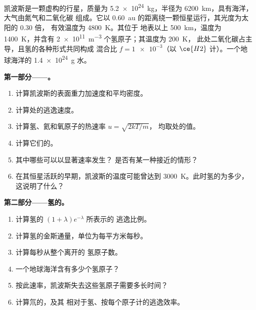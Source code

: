\begin{problem}
\label{pb:b3:planetary-atmospheres:1}
凯波斯是一颗虚构的行星，质量为 \qty{5.2e24}{kg}，半径为
\qty{6200}{km}，具有海洋，大气由氮气和二氧化碳
组成。它以 \qty{0.60}{au} 的距离绕一颗恒星运行，其光度为太阳的 0.30 倍，
有效温度为 \qty{4800}{K}。其位于
地表以上 \qty{500}{km}，温度为 \qty{1400}{K}，并含有
\qty{2e11}{m^{-3}} 个氢原子；其温度为 \qty{200}{K}，
此处二氧化碳占主导，且氢的各种形式共同构成
混合比 $f = \num{1e-3}$（以 $\ce{H2}$ 计）。一个地球海洋的
\qty{1.4e24}{g} 水。

\medskip\noindent\textbf{第一部分——。}
\begin{enumerate}
\item 计算凯波斯的表面重力加速度和平均密度。
\item 计算处的逃逸速度。
\item 计算氢、氦和氧原子的热速率 $u = \sqrt{2kT/m}$，
  均取处的值。
\item 计算它们的。
\item 其中哪些可以以显著速率发生？
  是否有某一种接近的情形？
\item 在其恒星活跃的早期，凯波斯的温度可能曾达到
  \qty{3000}{K}。此时氢的为多少，
  这说明了什么？
\end{enumerate}

\medskip\noindent\textbf{第二部分——氢的。}
\begin{enumerate}[resume]
\item 计算氢的 $(1 + \lambda)e^{-\lambda}$ 所表示的
  逃逸比例。
\item 计算氢的金斯通量，单位为每平方米每秒。
\item 计算每秒从整个离开的
  氢原子数。
\item 一个地球海洋含有多少个氢原子？
\item 按此速率，凯波斯失去这些氢原子需要多长时间？
\item 计算氘的，及其
  相对于氢、按每个原子计的逃逸效率。
\end{enumerate}


\end{problem}
